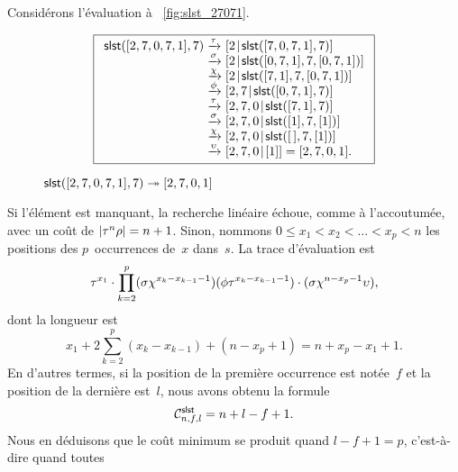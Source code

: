 Considérons l'évaluation à \fig~\vref{fig:slst_27071}.
\begin{figure}
\begin{equation*}
\boxed{%
\begin{array}{r@{\;}l@{\;}l}
\fun{slst}([2,7,0,7,1],7)
& \xrightarrow{\smash{\tau}}
& \cons{2}{\fun{slst}([7,0,7,1],7)}\\
& \xrightarrow{\smash{\sigma}}
& \cons{2}{\fun{slst}([0,7,1],7,[0,7,1])}\\
& \xrightarrow{\smash{\chi}}
& \cons{2}{\fun{slst}([7,1],7,[0,7,1])}\\
& \xrightarrow{\smash{\phi}}
& \cons{2,7}{\fun{slst}([0,7,1],7)}\\
& \xrightarrow{\smash{\tau}}
& \cons{2,7,0}{\fun{slst}([7,1],7)}\\
& \xrightarrow{\smash{\sigma}}
& \cons{2,7,0}{\fun{slst}([1],7,[1])}\\
& \xrightarrow{\smash{\chi}}
& \cons{2,7,0}{\fun{slst}(\el,7,[1])}\\
& \xrightarrow{\smash{\upsilon}}
& \cons{2,7,0}{[1]} = [2,7,0,1].
\end{array}}
\end{equation*}
\caption{\(\fun{slst}([2,7,0,7,1],7) \twoheadrightarrow [2,7,0,1]\)}
\label{fig:slst_27071}
\end{figure}
Si l'élément est manquant, la recherche linéaire échoue, comme à
l'accoutumée, avec un coût de \(\len{\tau^n\rho} = n + 1\). Sinon,
nommons \( 0 \leqslant x_1 < x_2 < \dots < x_p < n\) les positions des
\(p\)~occurrences de~\(x\) dans~\(s\). La trace
d'évaluation est
\begin{equation*}
\abovedisplayskip=0pt
\belowdisplayskip=0pt
\tau^{x_1}
\cdot
\prod_{k=2}^{p}(\sigma\chi^{x_k-x_{k-1}-1})(\phi\tau^{x_k-x_{k-1}-1})
\cdot
(\sigma\chi^{n-x_p-1}\upsilon),
\end{equation*}
dont la longueur est
\begin{equation*}
  x_1 + 2\sum_{k=2}^{p}(x_k-x_{k-1}) + (n - x_p + 1) = n + x_p - x_1 + 1.
\end{equation*}
En d'autres termes, si la position de la
première occurrence est notée~\(f\) et la position de la dernière
est~\(l\), nous avons obtenu la formule
\begin{equation*}
\C{\fun{slst}}{n,f,l} = n + l - f + 1.
\end{equation*}
Nous en déduisons que le coût minimum se produit quand \(l-f+1 = p\), c'est-à-dire quand toutes
